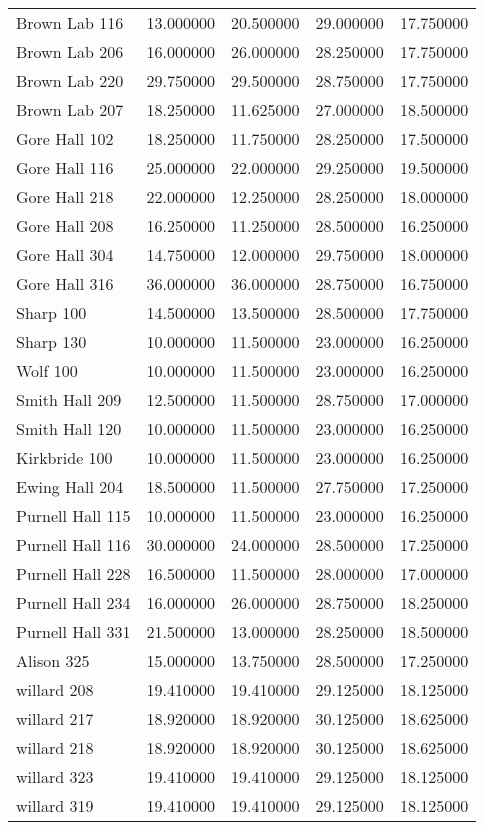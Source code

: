 \begin{tabular}{lrrrr}
Brown Lab 116 & 13.000000 & 20.500000 & 29.000000 & 17.750000 \\
Brown Lab 206 & 16.000000 & 26.000000 & 28.250000 & 17.750000 \\
Brown Lab 220 & 29.750000 & 29.500000 & 28.750000 & 17.750000 \\
Brown Lab 207 & 18.250000 & 11.625000 & 27.000000 & 18.500000 \\
Gore Hall 102 & 18.250000 & 11.750000 & 28.250000 & 17.500000 \\
Gore Hall 116 & 25.000000 & 22.000000 & 29.250000 & 19.500000 \\
Gore Hall 218 & 22.000000 & 12.250000 & 28.250000 & 18.000000 \\
Gore Hall 208 & 16.250000 & 11.250000 & 28.500000 & 16.250000 \\
Gore Hall 304 & 14.750000 & 12.000000 & 29.750000 & 18.000000 \\
Gore Hall 316 & 36.000000 & 36.000000 & 28.750000 & 16.750000 \\
Sharp 100 & 14.500000 & 13.500000 & 28.500000 & 17.750000 \\
Sharp 130 & 10.000000 & 11.500000 & 23.000000 & 16.250000 \\
Wolf 100 & 10.000000 & 11.500000 & 23.000000 & 16.250000 \\
Smith Hall 209 & 12.500000 & 11.500000 & 28.750000 & 17.000000 \\
Smith Hall 120 & 10.000000 & 11.500000 & 23.000000 & 16.250000 \\
Kirkbride 100 & 10.000000 & 11.500000 & 23.000000 & 16.250000 \\
Ewing Hall 204 & 18.500000 & 11.500000 & 27.750000 & 17.250000 \\
Purnell Hall 115 & 10.000000 & 11.500000 & 23.000000 & 16.250000 \\
Purnell Hall 116 & 30.000000 & 24.000000 & 28.500000 & 17.250000 \\
Purnell Hall 228 & 16.500000 & 11.500000 & 28.000000 & 17.000000 \\
Purnell Hall 234 & 16.000000 & 26.000000 & 28.750000 & 18.250000 \\
Purnell Hall 331 & 21.500000 & 13.000000 & 28.250000 & 18.500000 \\
Alison 325 & 15.000000 & 13.750000 & 28.500000 & 17.250000 \\
willard 208 & 19.410000 & 19.410000 & 29.125000 & 18.125000 \\
willard 217 & 18.920000 & 18.920000 & 30.125000 & 18.625000 \\
willard 218 & 18.920000 & 18.920000 & 30.125000 & 18.625000 \\
willard 323 & 19.410000 & 19.410000 & 29.125000 & 18.125000 \\
willard 319 & 19.410000 & 19.410000 & 29.125000 & 18.125000 \\
\end{tabular}
